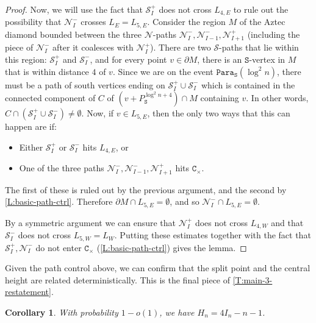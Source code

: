 \documentclass[11pt,twoside]{amsart}
\theoremstyle{plain}
\newtheorem{cor}[thm]{Corollary}
\numberwithin{quest}{section}
\theoremstyle{remark}
\numberwithin{rem}{section}
\theoremstyle{definition}
\newcommand{\cS}{\mathcal{S}}
\newcommand{\cN}{\mathcal{N}}
\renewcommand{\tt}[1]{{\mathtt{#1}}}
\begin{document}
\begin{proof}
		Now, we will use the fact that $\cS_I^+$ does not cross $L_{4, E}$ to rule out the possibility that $\cN_I^-$ crosses $L_E = L_{5, E}$. Consider the region $M$ of the Aztec diamond bounded between the three $\cN$-paths $\cN_I^-, \cN_{I-1}^-, \cN_{I+1}^+$ (including the piece of $\cN_I^-$ after it coalesces with $\cN_I^+$). There are two $\cS$-paths that lie within this region: $\cS_I^+$ and $\cS_I^-$, and for every point $v \in \partial M$, there is an $\tt{S}$-vertex in $M$ that is within distance $4$ of $v$. Since we are on the event $\tt{Para_S}(\log^2 n)$, there must be a path of south vertices ending on $\cS_I^+ \cup \cS_I^-$ which is contained in the connected component of $C$ of 
		$
		(v + P_\tt{S}^{\log^2 n + 4}) \cap M
		$
		containing $v$. In other words, $C \cap (\cS_I^+ \cup \cS_I^-) \ne \emptyset$. Now, if $v \in L_{5, E}$, then the only two ways that this can happen are if:
		\begin{itemize}[nosep]
			\item Either $\cS_I^+$ or $\cS_I^-$ hits $L_{4, E}$, or
			\item One of the three paths $\cN_I^-, \cN_{I-1}^-, \cN_{I+1}^+$ hits $\tt{C}_\times$.
		\end{itemize}
		The first of these is ruled out by the previous argument, and the second by \cref{L:basic-path-ctrl}. Therefore $\partial M \cap L_{5, E} = \emptyset$, and so $\cN_I^- \cap L_{5, E} = \emptyset$.
		
		By a symmetric argument we can ensure that $\cN_I^+$ does not cross $L_{4, W}$ and that $\cS_I^-$ does not cross $L_{5, W} = L_W$. Putting these estimates together with the fact that $\cS_I^+, \cN_I^-$ do not enter $\tt{C}_\times$ (\cref{L:basic-path-ctrl}) gives the lemma.
	\end{proof}
	
	Given the path control above, we can confirm that the split point and the central height are related deterministically. This is the final piece of \cref{T:main-3-restatement}. 
	
	\begin{cor}
		\label{C:height-path-equality}
		With probability $1 - o(1)$, we have $H_n = 4I_n - n - 1$.
	\end{cor}
	
\end{document}
